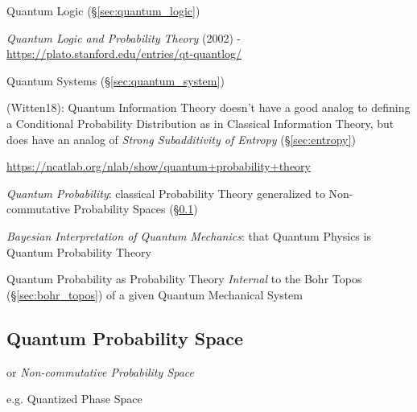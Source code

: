 Quantum Logic (\S\ref{sec:quantum_logic})

\emph{Quantum Logic and Probability Theory} (2002) -
\url{https://plato.stanford.edu/entries/qt-quantlog/}

Quantum Systems (\S\ref{sec:quantum_system})

(Witten18): Quantum Information Theory doesn't have a good analog to defining a
Conditional Probability Distribution as in Classical Information Theory, but
does have an analog of \emph{Strong Subadditivity of Entropy}
(\S\ref{sec:entropy})

\url{https://ncatlab.org/nlab/show/quantum+probability+theory}

\emph{Quantum Probability}: classical Probability Theory generalized to
Non-commutative Probability Spaces (\S\ref{sec:quantum_probability_space})

\emph{Bayesian Interpretation of Quantum Mechanics}: that Quantum Physics is
Quantum Probability Theory

Quantum Probability as Probability Theory \emph{Internal} to the Bohr Topos
(\S\ref{sec:bohr_topos}) of a given Quantum Mechanical System



\subsection{Quantum Probability Space}\label{sec:quantum_probability_space}

or \emph{Non-commutative Probability Space}

e.g. Quantized Phase Space
